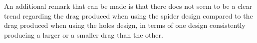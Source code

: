 








An additional remark that can be made is that there does not seem to be a clear trend regarding the drag produced when using the \gls{spider} design compared to the drag produced when using the \gls{holes} design, in terms of one design consistently producing a larger or a smaller drag than the other. 








